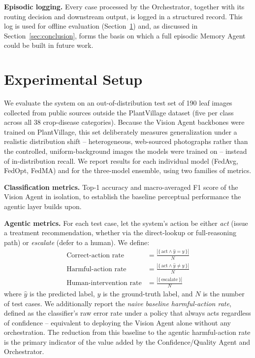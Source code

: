 \documentclass[conference]{IEEEtran}
\begin{document}
\textbf{Episodic logging.} Every case processed by the Orchestrator, together with its routing decision and downstream output, is logged in a structured record. This log is used for offline evaluation (Section~\ref{sec:exp}) and, as discussed in Section~\ref{sec:conclusion}, forms the basis on which a full episodic Memory Agent could be built in future work.

\section{Experimental Setup}
\label{sec:exp}

We evaluate the system on an out-of-distribution test set of 190 leaf images collected from public sources outside the PlantVillage dataset (five per class across all 38 crop-disease categories). Because the Vision Agent backbones were trained on PlantVillage, this set deliberately measures generalization under a realistic distribution shift -- heterogeneous, web-sourced photographs rather than the controlled, uniform-background images the models were trained on -- instead of in-distribution recall. We report results for each individual model (FedAvg, FedOpt, FedMA) and for the three-model ensemble, using two families of metrics.

\textbf{Classification metrics.} Top-1 accuracy and macro-averaged F1 score of the Vision Agent in isolation, to establish the baseline perceptual performance the agentic layer builds upon.

\textbf{Agentic metrics.} For each test case, let the system's action be either \emph{act} (issue a treatment recommendation, whether via the direct-lookup or full-reasoning path) or \emph{escalate} (defer to a human). We define:
\begin{align}
\text{Correct-action rate} &= \frac{|\{\,\text{act} \wedge \hat{y}=y\,\}|}{N} \\
\text{Harmful-action rate} &= \frac{|\{\,\text{act} \wedge \hat{y}\neq y\,\}|}{N} \\
\text{Human-intervention rate} &= \frac{|\{\,\text{escalate}\,\}|}{N}
\end{align}
where $\hat{y}$ is the predicted label, $y$ is the ground-truth label, and $N$ is the number of test cases. We additionally report the \emph{naive baseline harmful-action rate}, defined as the classifier's raw error rate under a policy that always acts regardless of confidence -- equivalent to deploying the Vision Agent alone without any orchestration. The reduction from this baseline to the agentic harmful-action rate is the primary indicator of the value added by the Confidence/Quality Agent and Orchestrator.
\end{document}
